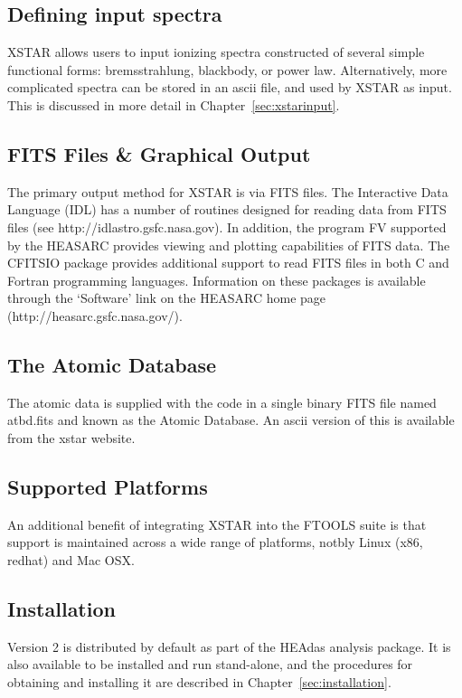 \subsection{Defining input spectra}

XSTAR allows users to input ionizing spectra constructed of several simple 
functional forms:  bremsstrahlung, blackbody, or power law.  Alternatively, 
more complicated spectra can be stored in an ascii file, and used by XSTAR 
as input.  This is discussed in more detail in Chapter~\ref{sec:xstarinput}.


\subsection{FITS Files \& Graphical Output}

The primary output method for XSTAR is via FITS files. The Interactive 
Data Language (IDL) has a number of routines designed for reading 
data from FITS files (see http://idlastro.gsfc.nasa.gov).  In 
addition, the program FV supported by the HEASARC provides 
viewing and plotting capabilities of FITS data.  The CFITSIO 
package provides additional support to read FITS files in both C and 
Fortran programming languages.  Information on these packages is 
available through the `Software' link on the HEASARC home page 
(http://heasarc.gsfc.nasa.gov/).

\subsection{The Atomic Database}
The atomic data is supplied with the code in a single binary FITS 
file named atbd.fits and known as the Atomic Database.  An ascii version of this is 
available from the xstar website.

\subsection{Supported Platforms}

An additional benefit of integrating XSTAR into the FTOOLS suite 
is that support is maintained across a wide range of platforms, notbly 
Linux (x86, redhat) and Mac OSX.

\subsection{Installation}

Version 2 is distributed by default as part of the HEAdas analysis 
package.  It is also available to be installed and run stand-alone, 
and the procedures for obtaining and installing it are described in Chapter~\ref{sec:installation}.

